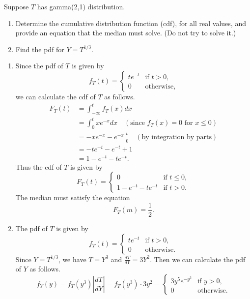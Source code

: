 \documentclass[12pt]{article}
\newenvironment{problem}[2][Problem]{\begin{trivlist}
\item[\hskip \labelsep {\bfseries #1}\hskip \labelsep {\bfseries #2.}]}
{\end{trivlist}}
\begin{document}
\begin{problem}{3}
Suppose $T$ has gamma(2,1) distribution.
\begin{enumerate}
  \item Determine the cumulative distribution function (cdf), 
  for all real values, and provide an equation that the 
  median must solve. (Do not try to solve it.)
  \item Find the pdf for $Y = T^{1/3}$.
\end{enumerate} 

\begin{enumerate}
  \item Since the pdf of $T$ is given by
  \[
    f_T (t) =
    \begin{cases}
      t e^{-t} & \text{if } t > 0, \\
      0 & \text{otherwise},
    \end{cases}
  \]
  we can calculate the cdf of $T$ as follows.
  \[
    \begin{aligned}
      F_T (t) &= \int_{-\infty}^{t} f_T (x) dx \\
      &= \int_0^t x e^{-x} dx \quad (\text{since } f_T (x) = 0 \text{ for } x \le 0)\\
      &= \left. -xe^{-x} - e^{-x} \right|_0^t \quad (\text{by integration by parts})\\
      &= -te^{-t} - e^{-t} + 1 \\
      &= 1 - e^{-t} - te^{-t}.
    \end{aligned}
  \]
  Thus the cdf of $T$ is given by
  \[
    F_T (t) =
    \begin{cases}
      0 & \text{if } t \le 0, \\
      1 - e^{-t} - te^{-t} & \text{if } t > 0.
    \end{cases}
  \]
  The median must satisfy the equation
  \[
    F_T (m) = \frac{1}{2}.
  \]
  \item The pdf of $T$ is given by
  \[
    f_T (t) =
    \begin{cases}
      t e^{-t} & \text{if } t > 0, \\
      0 & \text{otherwise}.
    \end{cases}
  \]
  Since $Y = T^{1/3}$, we have $T = Y^3$ and $\frac{dT}{dY} = 3Y^2$.
  Then we can calculate the pdf of $Y$ as follows.
  \[
    f_Y (y) = f_T (y^3) \left| \frac{dT}{dY} \right|
    = f_T (y^3) \cdot 3y^2 =
    \begin{cases}
      3y^5 e^{-y^3} & \text{if } y > 0, \\
      0 & \text{otherwise}.
    \end{cases}
  \]
\end{enumerate}

\end{problem}
\end{document}
